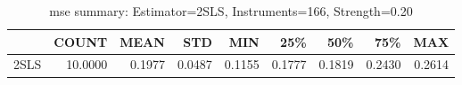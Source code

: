 \begin{table}[ht]
\centering
\caption{mse summary: Estimator=2SLS, Instruments=166, Strength=0.20}
\begin{tabular}{lrrrrrrrr}
\toprule
 & COUNT & MEAN & STD & MIN & 25\% & 50\% & 75\% & MAX \\
\midrule
2SLS & 10.0000 & 0.1977 & 0.0487 & 0.1155 & 0.1777 & 0.1819 & 0.2430 & 0.2614 \\
\bottomrule
\end{tabular}
\end{table}
